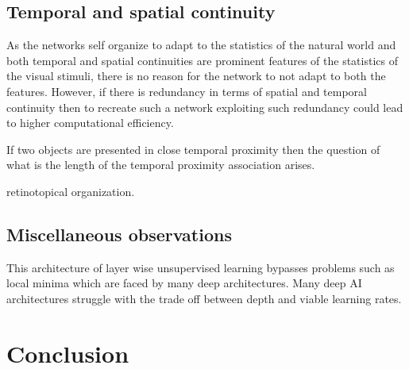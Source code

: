 \documentclass[12pt,twoside]{article}
\theoremstyle{plain}
\theoremstyle{definition}
\theoremstyle{remark}
\begin{document}
\subsection{Temporal and spatial continuity}
\label{Subsec:TempSpat}
As the networks self organize to adapt to the statistics of the natural world and both temporal and spatial continuities are prominent features of the statistics of the visual stimuli, there is no reason for the network to not adapt to both the features. However, if there is redundancy in terms of spatial and temporal continuity then to recreate such a network exploiting such redundancy could lead to higher computational efficiency.

If two objects are presented in close temporal proximity then the question of what is the length of the temporal proximity association arises. 

retinotopical organization.

\subsection{Miscellaneous observations}
This architecture of layer wise unsupervised learning bypasses problems such as local minima which are faced by many deep architectures. Many deep AI architectures struggle with the trade off between depth and viable learning rates.

\section{Conclusion}
\label{sec:concl}



%
%
\newpage


\end{document}
